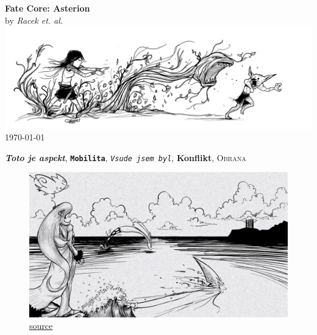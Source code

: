 \documentclass[12pt,a4paper,twoside,openany]{book}
\newcommand{\booktitle}{Fate Core: Asterion}
\newcommand{\authorname}{Racek et. al. }
\newcommand{\asp}[1]{\textbf{\textit{#1}}}   %
\newcommand{\dov}[1]{\texttt{\textbf{#1}}}   %
\newcommand{\trk}[1]{\texttt{\textit{#1}}} %
\newcommand{\akc}[1]{\textsc{#1}}            %
\newcommand{\per}[1]{\textbf{\fontfamily{phv}\selectfont #1}} %
\begin{document}
\begin{titlepage}
    \centering
    {\Huge\textbf{\booktitle}}\\[1.5cm]
    {\Large by \textit{\authorname}}\\[2cm]
    \includegraphics[width=\textwidth]{logo}\\[2cm]
    \vfill
    {\large \today}
\end{titlepage}

\frontmatter  %

\tableofcontents

\mainmatter   %
\setlength{\columnsep}{1cm}  %





\asp{Toto je aspekt}, \dov{Mobilita}, \trk{Vsude jsem byl}, \per{Konflikt}, \akc{Obrana}
\begin{figure}[h!]
  \centering
  \caption{\href{https://davidramos.ca/wp-content/uploads/2021/04/cyn-1024x576.png}{source}}
  \includegraphics[width=\textwidth]{jezero}
\end{figure}
\end{document}
